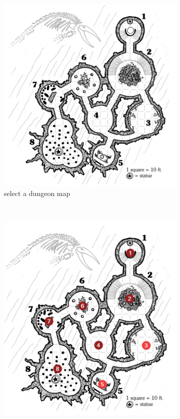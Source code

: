 \documentclass{UoYCSproject}
\begin{document}
\begin{figure}[htb]
  \centering
  \begin{subfigure}[b]{0.45\textwidth}
    \centering
    \includegraphics[width=\textwidth]{figures/step1.png}
    \caption{select a dungeon map}
  \end{subfigure}
  ~
  \begin{subfigure}[b]{0.45\textwidth}
    \centering
    \includegraphics[width=\textwidth]{figures/step2.png}

\end{subfigure}
\end{figure}
\end{document}
